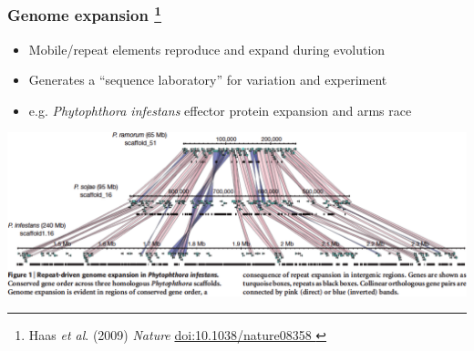 %
\begin{frame}
  \frametitle{Genome expansion
    \footnote{\tiny{Haas \textit{et al}. (2009) \textit{Nature} \href{http://dx.doi.org/10.1038/nature08358
}{doi:10.1038/nature08358
  }}}
}
  \begin{itemize}
    \item \textcolor{hutton_green}{Mobile/repeat elements reproduce and expand during evolution} 
    \item \textcolor{hutton_blue}{Generates a ``sequence laboratory'' for variation and experiment}
    \item \textcolor{RawSienna}{e.g. \textit{Phytophthora infestans} effector protein expansion and arms race}
  \end{itemize}  
    \begin{center}
      \includegraphics[width=\textwidth]{images/pi_expansion}      
    \end{center}    
\end{frame}

